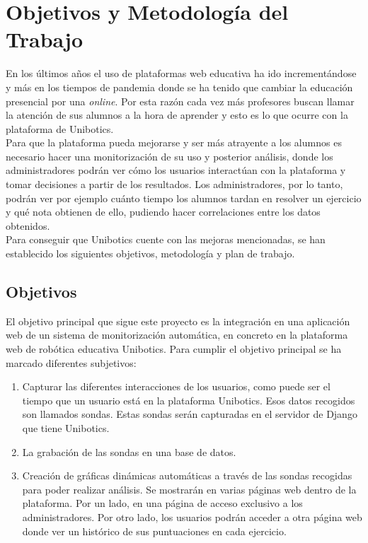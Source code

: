 \chapter{Objetivos y Metodología del Trabajo}\label{objetivos}

En los últimos años el uso de plataformas web educativa ha ido incrementándose y más en los tiempos de pandemia donde se ha tenido que cambiar la educación presencial por una \textit{online}. Por esta razón cada vez más profesores buscan llamar la atención de sus alumnos a la hora de aprender y esto es lo que ocurre con la plataforma de Unibotics.\\

Para que la plataforma pueda mejorarse y ser más atrayente a los alumnos es necesario hacer una monitorización de su uso y posterior análisis, donde los administradores podrán ver cómo los usuarios interactúan con la plataforma y tomar decisiones a partir de los resultados. Los administradores, por lo tanto, podrán ver por ejemplo cuánto tiempo los alumnos tardan en resolver un ejercicio y qué nota obtienen de ello, pudiendo hacer correlaciones entre los datos obtenidos.\\

Para conseguir que Unibotics cuente con las mejoras mencionadas, se han establecido los siguientes objetivos, metodología y plan de trabajo.


\section{Objetivos}

El objetivo principal que sigue este proyecto es la integración en una aplicación web de un sistema de monitorización automática,
en concreto en la plataforma web de robótica educativa
Unibotics. Para cumplir el objetivo principal se ha marcado diferentes subjetivos:\\

\begin{enumerate}
\item Capturar las diferentes interacciones de los usuarios, como puede ser el tiempo que un usuario está en la plataforma Unibotics. Esos datos recogidos son llamados sondas. Estas sondas serán capturadas en el servidor de Django que tiene Unibotics.
\item La grabación de las sondas en una base de datos.
\item Creación de gráficas dinámicas automáticas a través de las sondas recogidas para poder realizar análisis. Se mostrarán en varias páginas web dentro de la plataforma. Por un lado, en una página de acceso exclusivo a los administradores. Por otro lado, los usuarios podrán acceder a otra página web donde ver un histórico de sus puntuaciones en cada ejercicio.
\end{enumerate}

